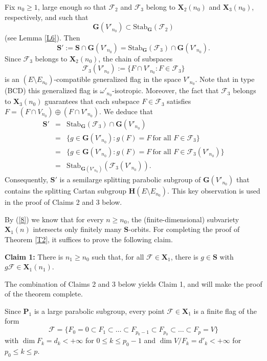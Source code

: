 \documentclass[12pt]{amsart}
\newcommand{\G}{\mathbf{G}}
\renewcommand{\H}{\mathbf{H}}
\renewcommand{\P}{\mathbf{P}}
\newcommand{\X}{\mathbf{X}}
\newcommand{\Ff}{\mathcal{F}}
\newcommand{\Stab}{\mathrm{Stab}}
\numberwithin{equation}{section}
\theoremstyle{definition}
\begin{document}
Fix $n_0\geq 1$, large enough so that $\Ff_2$ and $\Ff_3$ belong to $\X_2(n_0)$ and $\X_3(n_0)$, respectively, and such that
\[\G(V'_{n_0})\subset\Stab_\G(\Ff_2)\]
(see Lemma \ref{L6}). Then
\[\mathbf{S}':=\mathbf{S}\cap\G(V'_{n_0})=\Stab_\G(\Ff_3)\cap \G(V'_{n_0}).\]
Since $\Ff_3$ belongs to $\X_2(n_0)$, the chain of subspaces
\[\Ff_3(V'_{n_0}):=\{F\cap V'_{n_0}:F\in\Ff_3\}\]
is an $(E\setminus E_{n_0})$-compatible generalized flag in the space $V'_{n_0}$.
Note that in type (BCD) this generalized flag is $\omega'_{n_0}$-isotropic.
Moreover, the fact that $\Ff_3$ belongs to $\X_3(n_0)$ guarantees that each subspace $F\in\Ff_3$ satisfies $F=(F\cap V_{n_0})\oplus(F\cap V'_{n_0})$. 
We deduce that
\begin{eqnarray*}
\mathbf{S}' & = & \Stab_\G(\Ff_3)\cap\G(V'_{n_0}) \\ & = & \{g\in \G(V'_{n_0}):g(F)=F\ \mbox{for all $F\in\Ff_3$}\} \\
 & = & \{g\in \G(V'_{n_0}):g(F)=F\ \mbox{for all $F\in\Ff_3(V'_{n_0})$}\} \\
 & = & \Stab_{\G(V'_{n_0})}(\Ff_3(V'_{n_0})).
\end{eqnarray*}
Consequently, $\mathbf{S}'$ is a semilarge splitting parabolic subgroup of $\G(V'_{n_0})$ that contains the splitting Cartan subgroup $\H(E\setminus E_{n_0})$.
This key observation is used in the proof of Claims 2 and 3 below.

By (\ref{8}) we know that for every $n\geq n_0$, the (finite-dimensional) subvariety $\X_1(n)$ intersects only finitely many $\mathbf{S}$-orbits.
For completing the proof of Theorem \ref{T2}, it suffices to prove the following claim.

\medskip
{\bf Claim 1:} There is $n_1\geq n_0$ such that, for all $\Ff\in\X_1$, there is $g\in \mathbf{S}$ with  $g\Ff\in\X_1(n_1)$.

\medskip
The combination of Claims 2 and 3 below yields Claim 1, and will make the proof of the theorem complete.

Since $\P_1$ is a large parabolic subgroup, every point $\Ff\in\X_1$ is a finite flag of the form
\[\Ff=\{F_0=0\subset F_1\subset \ldots\subset F_{p_0-1}\subset F_{p_0}\subset\ldots\subset F_p=V\}\]
with $\dim F_k=d_k<+\infty$ for $0\leq k\leq p_0-1$ and $\dim V/F_k=d'_k<+\infty$ for $p_0\leq k\leq p$. 
\end{document}

